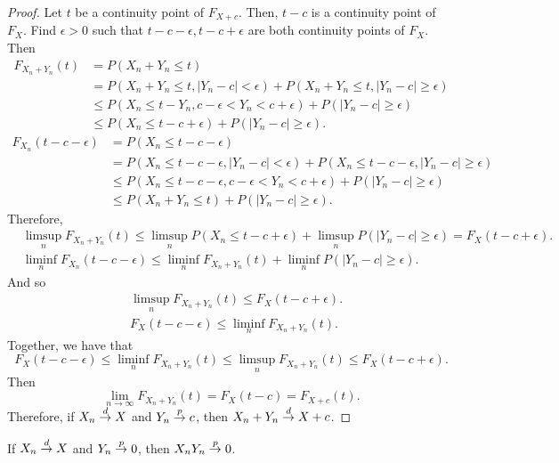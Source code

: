 \begin{proof}
Let $t$ be a continuity point of $F_{X+c}$. Then, $t - c$ is a continuity
point of $F_{X}$. Find $\epsilon > 0$ such that $t-c-\epsilon, t-c+\epsilon$ are both continuity points of $F_X$. Then
\begin{align*}
F_{X_n+Y_{n}}(t) &= P(X_n + Y_n \leq t)\\
&= P (X_n + Y_n \leq t, |Y_n - c| < \epsilon) + P (X_n +Y_n \leq t, |Y_n - c|\geq\epsilon)\\
&\leq P (X_n \leq t - Y_n, c -\epsilon < Y_n < c + \epsilon) + P (|Y_n - c| \geq\epsilon)\\
&\leq P (X_n \leq t - c + \epsilon) + P (|Y_n - c| \geq \epsilon).
\end{align*}
\begin{align*}
F_{X_n}(t-c-\epsilon) &= P(X_n \leq t-c-\epsilon)\\
&= P(X_n \leq t - c - \epsilon, |Y_n - c| < \epsilon) + P (X_n \leq t - c - \epsilon, |Y_n - c| \geq \epsilon)\\
&\leq P (X_n \leq t - c - \epsilon, c - \epsilon < Y_n < c + \epsilon) + P (|Y_n - c| \geq \epsilon)\\
&\leq P (X_n + Y_n \leq t) + P (|Y_n - c| \geq \epsilon).
\end{align*}
Therefore, 
\begin{align*}
&\limsup_n F_{X_n+Y_n}(t) \leq \limsup_n P(X_n \leq t - c + \epsilon) + \limsup_n P(|Y_n - c| \geq\epsilon) = F_X (t - c + \epsilon).\\
&\liminf_n F_{X_n}(t-c-\epsilon) \leq \liminf_n F_{X_n +Y_n}(t) + \liminf_n P(|Y_n - c| \geq\epsilon).
\end{align*}
And so
\begin{align*}
&\limsup_n F_{X_n+Y_n}(t)\leq F_X (t - c + \epsilon).\\
&F_{X}(t-c-\epsilon)\leq \liminf_n F_{X_n+Y_n}(t).
\end{align*}
Together, we have that
\[
F_X (t - c - \epsilon) \leq \liminf_n F_{X_n+Y_n}(t) \leq \limsup_n F_{X_n+Y_n}(t)\leq F_X(t-c+\epsilon).
\]
Then
\[
\lim_{n\to\infty}F_{X_n+Y_n}(t) = F_X(t-c) = F_{X+c}(t).
\]
Therefore, if $X_n \overset{d}{\rightarrow} X$ and $Y_n \overset{p}{\rightarrow} c$, then $X_n + Y_n \overset{d}{\rightarrow} X + c$.
\end{proof}
\begin{lemma}
If $X_n \overset{d}{\rightarrow} X$ and $Y_n \overset{p}{\rightarrow} 0$, then $X_nY_n \overset{p}{\rightarrow} 0$.\label{cover}
\end{lemma}
